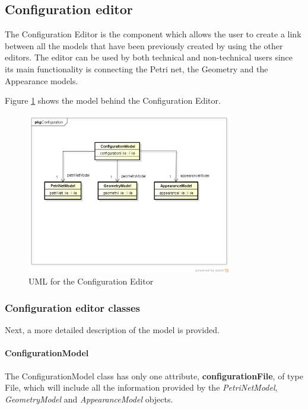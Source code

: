 \subsection{Configuration editor}

The Configuration Editor is the component which allows the user to create a link between all the models that have been previously created by using the other editors. The editor can be used by both technical and non-technical users since its main functionality is connecting the Petri net, the Geometry and the Appearance models. 

Figure \ref{fig:uml-configuration-editor} shows the model behind the Configuration Editor. 

\begin{figure}[htp]
\begin{center}
  \includegraphics[width=0.8\textwidth]{image/configuration-model.png}
  \caption{UML for the Configuration Editor}
  \label{fig:uml-configuration-editor}
\end{center}
\end{figure}

\subsubsection{Configuration editor classes}

Next, a more detailed description of the model is provided.

\paragraph{ConfigurationModel}

The ConfigurationModel class has only one attribute, \textbf{configurationFile}, of type File, which will include all the information provided by the \textit{PetriNetModel}, \textit{GeometryModel} and \textit{AppearanceModel} objects. 

